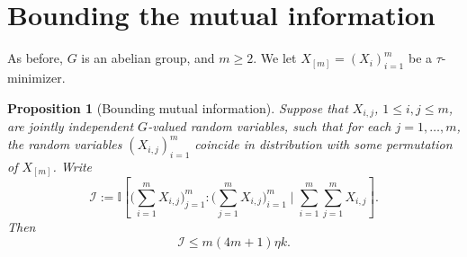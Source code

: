 \documentclass[10pt,a4paper]{article}
\newtheorem{proposition}[theorem]{Proposition}
\newcommand{\lean}[1]{}
\newcommand{\leanok}{}
\newcommand{\bbI}{\mathbb{I}}
\begin{document}
\section{Bounding the mutual information}

As before, $G$ is an abelian group, and $m\geq 2$.  We let $X_{[m]} = (X_i)_{i =1}^m$ be a $\tau$-minimizer.

\begin{proposition}[Bounding mutual information]\label{key}\lean{mutual_information_le}\leanok
Suppose that $X_{i,j}$, $1 \leq i,j \leq m$, are jointly independent $G$-valued random variables, such that for each $j = 1,\dots,m$, the random variables $(X_{i,j})_{i = 1}^m$ coincide in distribution with some permutation of $X_{[m]}$.
  Write
  \[
    {\mathcal I} := \bbI[ \bigl(\sum_{i=1}^m X_{i,j}\bigr)_{j =1}^{m} : \bigl(\sum_{j=1}^m X_{i,j}\bigr)_{i = 1}^m \; \big| \; \sum_{i=1}^m \sum_{j = 1}^m  X_{i,j} ].
  \]
Then
  \begin{equation}\label{I-ineq}
    {\mathcal I} \leq m(4m+1) \eta k.
  \end{equation}
\end{proposition}
\end{document}
